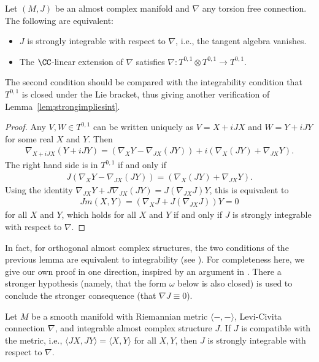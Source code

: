 \begin{lem} \label{lem:strongintequiv}
Let $(M,J)$ be an almost complex manifold and $\nabla$ any torsion free connection. The following are equivalent:
\begin{itemize}\itemsep=0pt
\item $J$ is strongly integrable with respect to $\nabla$, i.e., the tangent algebra vanishes.
\item The $\CC$-linear extension of $\nabla$ satisfies $\nabla\colon T^{0,1} \otimes T^{0,1} \to T^{0,1}$.
\end{itemize}
\end{lem}

The second condition should be compared with the integrability condition that $T^{0,1}$ is closed under the Lie bracket, thus giving another verification of Lemma~\ref{lem;strongimpliesint}.

\begin{proof}Any $V,W \in T^{0,1}$ can be written uniquely as $V = X + iJX$ and $W = Y + iJY$ for some real $X$ and $Y$. Then
\begin{gather*}
\nabla_{X+ iJX} (Y + i JY) = (\nabla_X Y - \nabla_{JX} (JY) ) + i (\nabla_X (JY) + \nabla_{JX} Y ).
\end{gather*}
The right hand side is in $ T^{0,1}$ if and only if
\begin{gather*}
J (\nabla_X Y - \nabla_{JX} (JY) ) = (\nabla_X (JY) + \nabla_{JX} Y ).
\end{gather*}
Using the identity $\nabla_{JX} Y + J\nabla_{JX} (JY) = J ( \nabla_{JX} J ) Y$, this is equivalent to
\begin{gather*}
Jm(X,Y)= ( \nabla_X J +J ( \nabla_{JX} J ) ) Y = 0
\end{gather*}
for all $X$ and $Y$, which holds for all $X$ and $Y$ if and only if $J$ is strongly integrable with respect to $\nabla$.
\end{proof}

In fact, for orthogonal almost complex structures, the two conditions of the previous lemma are equivalent to integrability (see \cite[p.~267]{S}). For completeness here, we give our own proof in one direction, inspired by an argument in \cite[Appendix~C.7]{McS}. There a stronger hypothesis (namely, that the form $\omega$ below is also closed) is used to conclude the stronger consequence (that $\nabla J \equiv 0$).

\begin{thm} \label{thm;Jintorth} Let $M$ be a smooth manifold with Riemannian metric $\langle - ,- \rangle$, Levi-Civita connection $\nabla$, and integrable almost complex structure $J$. If $J$ is compatible with the metric, i.e., $\langle JX,JY \rangle = \langle X,Y \rangle $ for all $X,Y$, then $J$ is strongly integrable with respect to $\nabla$.
\end{thm}

